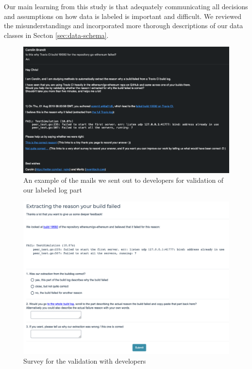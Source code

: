 \documentclass[\myrootdir/main.tex]{subfiles}
\begin{document}
Our main learning from this study is that adequately communicating all decisions and assumptions on how data is labeled is important and difficult.
We reviewed the misunderstandings and incorporated more thorough descriptions of our data classes in Secton \ref{sec:data-schema}.

\begin{figure}[h]
	\centering
	\includegraphics[width=\textwidth, clip]{img/dev-mail.png}
	\caption{An example of the mails we sent out to developers for validation of our labeled log part}
	\label{fig:dev-mail}
\end{figure}
\begin{figure}[h]
	\centering
	\includegraphics[width=\textwidth, clip]{img/dev-survey.png}
	\caption{Survey for the validation with developers}
	\label{fig:dev-survey}
\end{figure}
\end{document}
